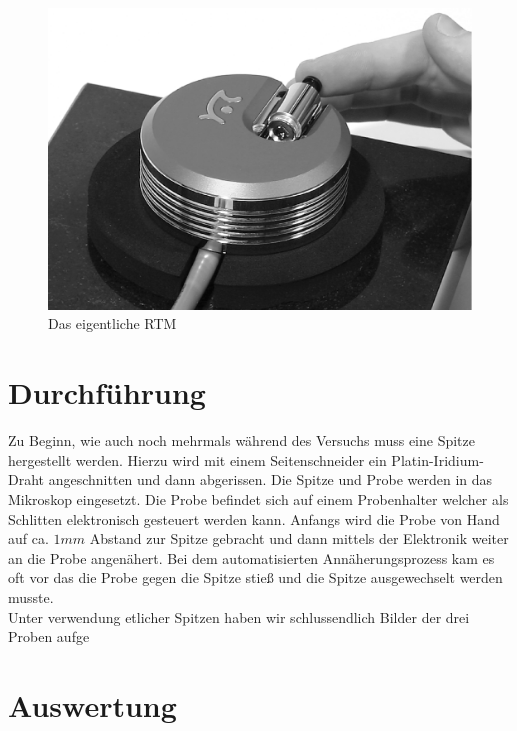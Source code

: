 \documentclass[12pt]{article}
\begin{document}
\begin{figure}[H]
\centering
\includegraphics[width=0.9\linewidth]{pictures/rastertunnel.eps}
\caption{Das eigentliche RTM}
\end{figure}
\section{Durchführung}
Zu Beginn, wie auch noch mehrmals während des Versuchs muss eine Spitze hergestellt werden. Hierzu wird mit einem Seitenschneider ein Platin-Iridium-Draht angeschnitten und dann abgerissen. Die Spitze und Probe werden in das Mikroskop eingesetzt. Die Probe befindet sich auf einem Probenhalter welcher als Schlitten elektronisch gesteuert werden kann. Anfangs wird die Probe von Hand auf ca. $1mm$ Abstand zur Spitze gebracht und dann mittels der Elektronik weiter an die Probe angenähert.
Bei dem automatisierten Annäherungsprozess kam es oft vor das die Probe gegen die Spitze stieß und die Spitze ausgewechselt werden musste. \\

Unter verwendung etlicher Spitzen haben wir schlussendlich Bilder der drei Proben aufge
\section{Auswertung}
\end{document}
